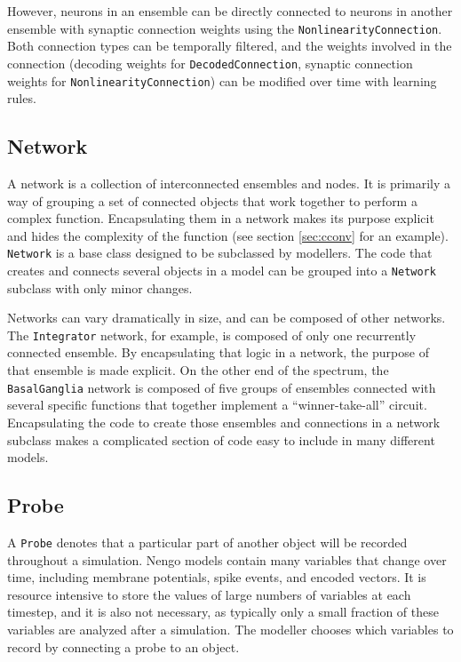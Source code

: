 \documentclass{frontiersSCNS}
\begin{document}
However, neurons in an ensemble can be directly connected
to neurons in another ensemble
with synaptic connection weights
using the \texttt{NonlinearityConnection}.
Both connection types
can be temporally filtered,
and the weights involved in the connection
(decoding weights for \texttt{DecodedConnection},
synaptic connection weights for \texttt{NonlinearityConnection})
can be modified over time with learning rules.

\subsection{Network}

A network is a collection of interconnected ensembles and nodes.
It is primarily a way of grouping
a set of connected objects
that work together to perform a complex function.
Encapsulating them in a network
makes its purpose explicit
and hides the complexity of the function
(see section \ref{sec:cconv} for an example).
\texttt{Network} is a base class designed to be
subclassed by modellers.
The code that creates and connects
several objects in a model can be
grouped into a \texttt{Network} subclass
with only minor changes.

Networks can vary dramatically in size,
and can be composed of other networks.
The \texttt{Integrator} network, for example,
is composed of only one recurrently connected ensemble.
By encapsulating that logic in a network,
the purpose of that ensemble is made explicit.
On the other end of the spectrum,
the \texttt{BasalGanglia} network
is composed of five groups of ensembles
connected with several specific functions
that together implement a ``winner-take-all'' circuit.
Encapsulating the code to create those ensembles
and connections in a network subclass
makes a complicated section of code
easy to include in many different models.

\subsection{Probe}

A \texttt{Probe} denotes that
a particular part of another object
will be recorded throughout a simulation.
Nengo models contain many variables
that change over time,
including membrane potentials,
spike events, and encoded vectors.
It is resource intensive to store the values of
large numbers of variables
at each timestep, and it is also not necessary,
as typically only a small fraction
of these variables are analyzed after a simulation.
The modeller chooses which variables to
record by connecting a probe to an object.
\end{document}
